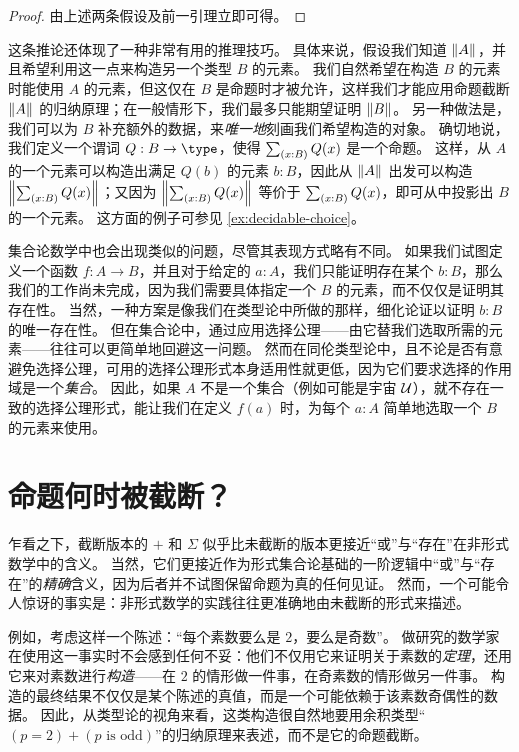 \begin{proof}
  由上述两条假设及前一引理立即可得。
\end{proof}

这条推论还体现了一种非常有用的推理技巧。
具体来说，假设我们知道 $\mathopen{}\left\Vert A\right\Vert_{}\mathclose{}$，并且希望利用这一点来构造另一个类型 $B$ 的元素。
我们自然希望在构造 $B$ 的元素时能使用 $A$ 的元素，但这仅在 $B$ 是命题时才被允许，这样我们才能应用命题截断 $\mathopen{}\left\Vert A\right\Vert_{}\mathclose{}$ 的归纳原理；在一般情形下，我们最多只能期望证明 $\mathopen{}\left\Vert B\right\Vert_{}\mathclose{}$。
%
另一种做法是，我们可以为 $B$ 补充额外的数据，来\emph{唯一地}刻画我们希望构造的对象。
确切地说，我们定义一个谓词 $Q:B\to\type$，使得 $\sm{x:B} Q(x)$ 是一个命题。
这样，从 $A$ 的一个元素可以构造出满足 $Q(b)$ 的元素 $b:B$，因此从 $\mathopen{}\left\Vert A\right\Vert_{}\mathclose{}$ 出发可以构造 $\brck{\sm{x:B} Q(x)}$；又因为 $\brck{\sm{x:B} Q(x)}$ 等价于 $\sm{x:B} Q(x)$，即可从中投影出 $B$ 的一个元素。
这方面的例子可参见 \cref{ex:decidable-choice}。

集合论数学中也会出现类似的问题，尽管其表现方式略有不同。
如果我们试图定义一个函数 $f: A \to B$，并且对于给定的 $a : A$，我们只能证明存在某个 $b : B$，那么我们的工作尚未完成，因为我们需要具体指定一个 $B$ 的元素，而不仅仅是证明其存在性。
当然，一种方案是像我们在类型论中所做的那样，细化论证以证明 $b:B$ 的唯一存在性。
但在集合论中，通过应用选择公理——由它替我们选取所需的元素——往往可以更简单地回避这一问题。
然而在同伦类型论中，且不论是否有意避免选择公理，可用的选择公理形式本身适用性就更低，因为它们要求选择的作用域是一个\emph{集合}。
因此，如果 $A$ 不是一个集合（例如可能是宇宙 $\mathcal{U}$），就不存在一致的选择公理形式，能让我们在定义 $f(a)$ 时，为每个 $a : A$ 简单地选取一个 $B$ 的元素来使用。

%

\section{命题何时被截断？}
\label{subsec:when-trunc}

%
%
%

乍看之下，截断版本的 $+$ 和 $\Sigma$ 似乎比未截断的版本更接近``或''与``存在''在非形式数学中的含义。
当然，它们更接近作为形式集合论基础的一阶逻辑中``或''与``存在''的\emph{精确}含义，因为后者并不试图保留命题为真的任何见证。
然而，一个可能令人惊讶的事实是：非形式数学的实践往往更准确地由未截断的形式来描述。

%
例如，考虑这样一个陈述：``每个素数要么是 $2$，要么是奇数''。
做研究的数学家在使用这一事实时不会感到任何不妥：他们不仅用它来证明关于素数的\emph{定理}，还用它来对素数进行\emph{构造}——在 $2$ 的情形做一件事，在奇素数的情形做另一件事。
构造的最终结果不仅仅是某个陈述的真值，而是一个可能依赖于该素数奇偶性的数据。
因此，从类型论的视角来看，这类构造很自然地要用余积类型``$(p=2)+(p\text{ is odd})$''的归纳原理来表述，而不是它的命题截断。

